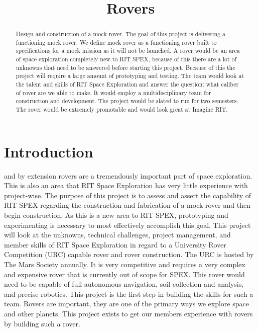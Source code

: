 \documentclass[conference]{IEEEtran} %
\title{Rovers} %
\author{
  \IEEEauthorblockN{Thomas~Hall\IEEEauthorrefmark{1}}
  \IEEEauthorblockA{RIT Space Exploration, Rochester Institute of Technology \\ Rochester, N.Y. \\ Email: \IEEEauthorrefmark{1}tjh2822@g.rit.edu }
}
\begin{document}
\maketitle
{}

\begin{abstract}
Design and construction of a mock-rover. 
The goal of this project is delivering a functioning mock rover.
We define mock rover as a functioning rover built to specifications for a mock mission as it will not be launched.
A rover would be an area of space exploration completely new to RIT SPEX, because of this there are a lot of unknowns that need to be answered before starting this project. 
Because of this the project will require a large amount of prototyping and testing. 
The team would look at the talent and skills of RIT Space Exploration and answer the question: what caliber of rover are we able to make. 
It would employ a multidisciplinary team for construction and development. The project would be slated to run for two semesters. 
The rover would be extremely promotable and would look great at Imagine RIT. 
\end{abstract}

\label{sec:nomenclature}
\newcommand{\nomunit}[1]{\renewcommand{\nomentryend}{\hspace*{\fill}#1}}
\renewcommand{\nompreamble}{}


\section{Introduction}
\label{sec:introduction}

  and by extension rovers are a tremendously important
part of space exploration. 
This is also an area that RIT Space Exploration has very little experience with project-wise.
The purpose of this project is to assess and assert the capability of RIT SPEX regarding the construction and fabrication of a mock-rover and then begin construction. 
As this is a new area to RIT SPEX, prototyping and experimenting is necessary to most effectively accomplish this goal. 
This project will look at the unknowns, technical challenges, project management, and member skills of RIT Space Exploration in regard to a University Rover Competition (URC) capable rover and rover construction. 
The URC is hosted by The Mars Society annually. 
It is very competitive and requires a very complex and expensive rover that is currently out of scope for SPEX. 
This rover would need to be capable of full autonomous navigation, soil collection and analysis, and precise robotics. 
This project is the first step in building the skills for such a team.
Rovers are important, they are one of the primary ways we explore space and other planets. 
This project exists to get our members experience with rovers by building such a rover. 
\end{document}
